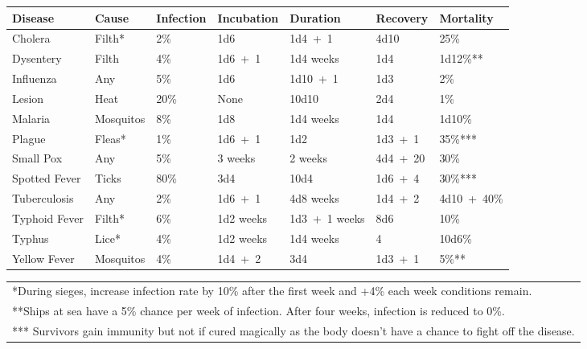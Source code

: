 \noindent
\begin{minipage}{\columnwidth}

\label{diseases}
\noindent
\begin{tabular}{|p{}|p{}|p{}|p{}|p{}|p{}|p{}|}
\hline
Disease			& Cause		& Infection	& Incubation	& Duration	& Recovery	& Mortality \\
\hline\hline
\rowcolor[gray]{.9}Cholera			& Filth*	& 2\%	& 1d6		& 1d4~+~1		& 4d10		& 25\% \\
Dysentery		& Filth		& 4\%	& 1d6~+~1	& 1d4 weeks		& 1d4		& 1d12\%** \\
\rowcolor[gray]{.9}Influenza		& Any		& 5\%	& 1d6		& 1d10~+~1		& 1d3		& 2\% \\
Lesion			& Heat		& 20\%	& None		& 10d10			& 2d4		& 1\% \\
\rowcolor[gray]{.9}Malaria			& Mosquitos	& 8\%	& 1d8		& 1d4 weeks		& 1d4		& 1d10\% \\
Plague			& Fleas*	& 1\%	& 1d6~+~1	& 1d2			& 1d3~+~1	& 35\%*** \\
\rowcolor[gray]{.9}Small Pox		& Any		& 5\%	& 3 weeks	& 2 weeks		& 4d4~+~20	& 30\% \\
Spotted Fever	& Ticks		& 80\%	& 3d4		& 10d4			& 1d6~+~4	& 30\%*** \\
\rowcolor[gray]{.9}Tuberculosis	& Any		& 2\%	& 1d6~+~1	& 4d8 weeks		& 1d4~+~2	& 4d10~+~40\% \\
Typhoid Fever	& Filth*	& 6\%	& 1d2 weeks	& 1d3~+~1 weeks	& 8d6 		& 10\% \\
\rowcolor[gray]{.9}Typhus			& Lice*		& 4\%	& 1d2 weeks	& 1d4 weeks		& 4			& 10d6\% \\
Yellow Fever	& Mosquitos	& 4\%	& 1d4~+~2	& 3d4			& 1d3~+~1	& 5\%** \\
\hline
\end{tabular}
\noindent\begin{tabular}{p{}}
*During sieges, increase infection rate by 10\% after the first week and +4\% each week conditions remain. \\
**Ships at sea have a 5\% chance per week of infection.  After four weeks, infection is reduced to 0\%. \\
*** Survivors gain immunity but not if cured magically as the body doesn't have a chance to fight off the disease. \\
\end{tabular}\vspace{.5em}

\end{minipage}

